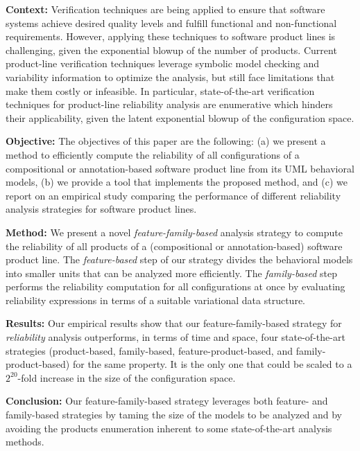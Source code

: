 \textbf{Context:} Verification techniques are being applied to ensure that
software systems achieve desired quality levels and fulfill functional and
non-functional requirements.  However, applying these techniques to software
product lines is challenging, given the exponential blowup of the number of
products. Current product-line verification techniques leverage symbolic
model checking and variability information to optimize the analysis, but
still face limitations that make them costly or infeasible. In particular,
state-of-the-art verification techniques for product-line reliability
analysis are enumerative which hinders their applicability, given the latent
exponential blowup of the configuration space. 

\textbf{Objective:} The objectives of this paper are the following: (a) we
present a method to efficiently compute the reliability of all configurations
of a compositional or annotation-based software product line from its UML
behavioral models, (b) we provide a tool that implements the proposed method,
and (c) we report on an empirical study comparing the performance of
different reliability analysis strategies for software product lines. 

\textbf{Method:}  We present a novel \textit{feature-family-based} analysis
strategy to compute the reliability of all products of a (compositional or
annotation-based) software product line. The \emph{feature-based} step of our
strategy divides the behavioral models into smaller units that can be
analyzed more efficiently. The \emph{family-based} step performs the
reliability computation for all configurations at once by evaluating
reliability expressions in terms of a suitable variational data structure. 

\textbf{Results:} Our empirical results show that our feature-family-based
strategy for \textit{reliability} analysis outperforms, in terms of time and
space, four state-of-the-art strategies (product-based, family-based,
feature-product-based, and fam\-i\-ly-prod\-uct-based) for the same property.
It is the only one that could be scaled to a $2^{20}$-fold increase in the size
of the configuration space. 

\textbf{Conclusion:}  Our feature-family-based strategy leverages both
feature- and family-based strategies by taming the size of the models to be
analyzed and by avoiding the products enumeration inherent to some
state-of-the-art analysis methods.   
